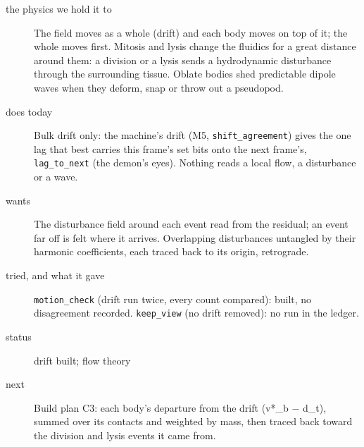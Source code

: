\begin{description}
\item[{the physics we hold it to}] The field moves as a whole (drift) and each body moves on top of it; the whole moves first. Mitosis and lysis change the fluidics for a great distance around them: a division or a lysis sends a hydrodynamic disturbance through the surrounding tissue. Oblate bodies shed predictable dipole waves when they deform, snap or throw out a pseudopod.
\item[{does today}] Bulk drift only: the machine's drift (M5, \texttt{shift\_\allowbreak{}agreement}) gives the one lag that best carries this frame's set bits onto the next frame's, \texttt{lag\_\allowbreak{}to\_\allowbreak{}next} (the demon's eyes). Nothing reads a local flow, a disturbance or a wave.
\item[{wants}] The disturbance field around each event read from the residual; an event far off is felt where it arrives. Overlapping disturbances untangled by their harmonic coefficients, each traced back to its origin, retrograde.
\item[{tried, and what it gave}] \texttt{motion\_\allowbreak{}check} (drift run twice, every count compared): built, no disagreement recorded. \texttt{keep\_\allowbreak{}view} (no drift removed): no run in the ledger.
\item[{status}] drift built; flow theory
\item[{next}] Build plan C3: each body's departure from the drift (v*\_\allowbreak{}b − d\_\allowbreak{}t), summed over its contacts and weighted by mass, then traced back toward the division and lysis events it came from.
\end{description}

